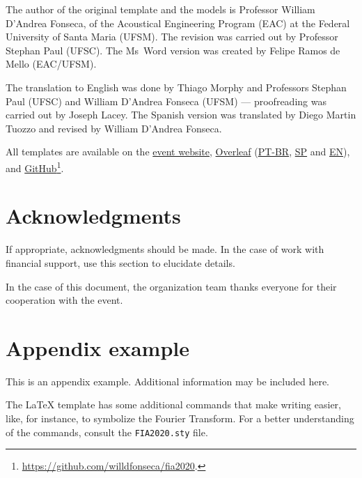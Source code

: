 \documentclass[12pt, a4paper, twoside, twocolumn]{article}
\begin{document}
The author of the original template and the models is Professor William D'Andrea Fonseca, of the Acoustical Engineering Program (EAC) at the Federal University of Santa Maria (UFSM). 
%
The revision was carried out by Professor Stephan Paul (UFSC).
%
The Ms~Word version was created by Felipe Ramos de Mello (EAC/UFSM).

The translation to English was done by Thiago Morphy and Professors Stephan Paul (UFSC) and William D'Andrea Fonseca (UFSM) --- proofreading was carried out by Joseph Lacey.
%
The Spanish version was translated by Diego Martin Tuozzo and revised by William D'Andrea Fonseca.


All templates are available on the \href{http://www.fia2022.com.br}{event website}, \href{https://www.overleaf.com/read/hgryywpgmxdx}{Overleaf} (\href{https://www.overleaf.com/read/rnfjxkknksnd}{PT-BR}, \href{https://www.overleaf.com/read/rszcxtwshzfr}{SP} and \href{https://www.overleaf.com/read/hgryywpgmxdx}{EN}),  and \href{https://github.com/willdfonseca/fia2020}{GitHub}\footnote{\url{https://github.com/willdfonseca/fia2020}.}.

\section{Acknowledgments}

If appropriate, acknowledgments should be made. In the case of work with financial support, use this section to elucidate details.

In the case of this document, the organization team thanks everyone for their cooperation with the event.

\renewcommand{\refname}{References} 
 
{\fontrefs }
\appendix
\section{Appendix example}

This is an appendix example. Additional information may be included here.

The \LaTeX\xspace template has some additional commands that make writing easier, like, for instance, \F\xspace to symbolize the Fourier Transform. For a better understanding of the commands, consult the \texttt{FIA2020.sty} file.
\end{document}
